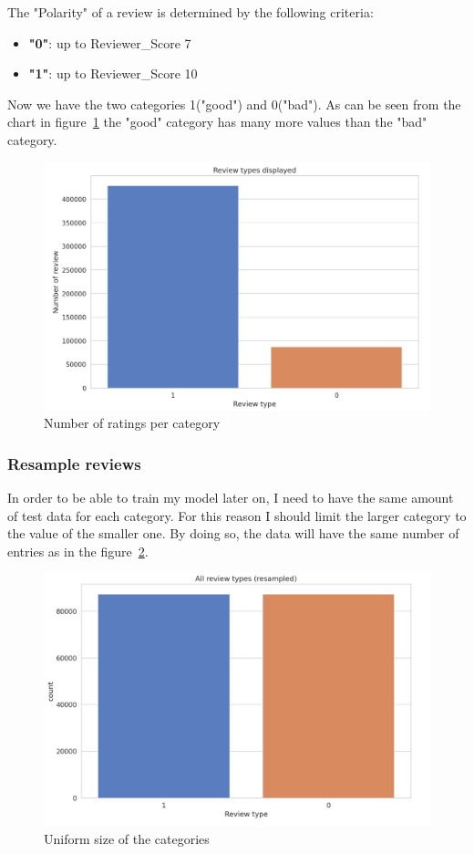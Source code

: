 The "Polarity" of a review is determined by the following criteria:
\begin{itemize}
\item \textbf{"0"}: up to Reviewer\_Score 7
\item \textbf{"1"}: up to Reviewer\_Score 10
\end{itemize}

Now we have the two categories 1("good") and 0("bad"). As can be seen from the chart in figure~\ref{fig:fig_03}  the "good" category has many more values than the "bad" category.

\begin{figure}[H]
\centering
\includegraphics[width=1\textwidth]{images/rev1div.jpg}
\caption{Number of ratings per category}
\label{fig:fig_03}
\end{figure}
\FloatBarrier
\newpage
\subsubsection{Resample reviews}
In order to be able to train my model later on, I need to have the same amount of test data for each category. For this reason I should limit the larger category to the value of the smaller one. By doing so, the data will have  the same number of entries as in the figure~\ref{fig:fig_04}.

\begin{figure}[H]
\centering
\includegraphics[width=1\textwidth]{images/rev2div.jpg}
\caption{Uniform size of the categories}
\label{fig:fig_04}
\end{figure}
\FloatBarrier

